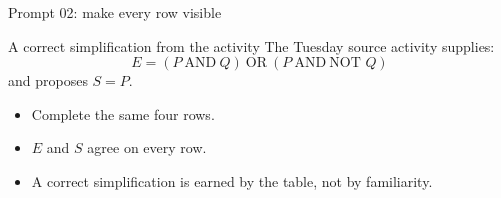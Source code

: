 \begin{frame}[fragile]{Prompt 02: make every row visible}
\end{frame}

\begin{frame}{A correct simplification from the activity}
The Tuesday source activity supplies:
\[
E=(P\ \text{AND}\ Q)\ \text{OR}\ (P\ \text{AND}\ \text{NOT }Q)
\]
and proposes $S=P$.
\begin{itemize}
\item Complete the same four rows.
\item $E$ and $S$ agree on every row.
\item A correct simplification is earned by the table, not by familiarity.
\end{itemize}
\end{frame}

